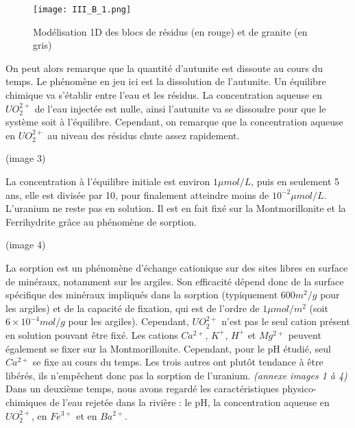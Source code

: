 \documentclass{article}
\begin{document}
\begin{figure}[H]
    \centering
    \texttt{[image: III\_B\_1.png]}
    \caption{Modélisation 1D des blocs de résidus (en rouge) et de granite (en gris)}
    \label{fig:modele_bloc}
\end{figure}

On peut alors remarque que la quantité d’autunite est dissoute au cours du temps. Le phénomène en jeu ici est la dissolution de l’autunite. Un équilibre chimique va s’établir entre l’eau et les résidus. La concentration aqueuse en $UO_2^{2+}$ de l’eau injectée est nulle, ainsi l’autunite va se dissoudre pour que le système soit à l’équilibre. Cependant, on remarque que la concentration aqueuse en $UO_2^{2+}$ au niveau des résidus chute assez rapidement.

(image 3)

La concentration à l’équilibre initiale est environ $1 \mu mol/L$, puis en seulement 5 ans, elle est divisée par 10, pour finalement atteindre moins de $10^{-2} \mu mol/L$. L’uranium ne reste pas en solution. Il est en fait fixé sur la Montmorillonite et la Ferrihydrite grâce au phénomène de sorption.

(image 4)

La sorption est un phénomène d’échange cationique sur des sites libres en surface de minéraux, notamment sur les argiles. Son efficacité dépend donc de la surface spécifique des minéraux impliqués dans la sorption (typiquement $600 m^2/g$ pour les argiles) et de la capacité de fixation, qui est de l’ordre de $1 \mu mol/m^2$ (soit $6 \times 10^{-4} mol/g$ pour les argiles). Cependant, $UO_2^{2+}$ n’est pas le seul cation présent en solution pouvant être fixé. Les cations $Ca^{2+}$, $K^{+}$, $H^{+}$ et $Mg^{2+}$ peuvent également se fixer sur la Montmorillonite. Cependant, pour le pH étudié, seul $Ca^{2+}$ se fixe au cours du temps. Les trois autres ont plutôt tendance à être libérés, ils n’empêchent donc pas la sorption de l’uranium. \emph{(annexe images 1 à 4)}
Dans un deuxième temps, nous avons regardé les caractéristiques physico-chimiques de l’eau rejetée dans la rivière : le pH, la concentration aqueuse en $UO_2^{2+}$, en $Fe^{3+}$ et en $Ba^{2+}$.
\end{document}
